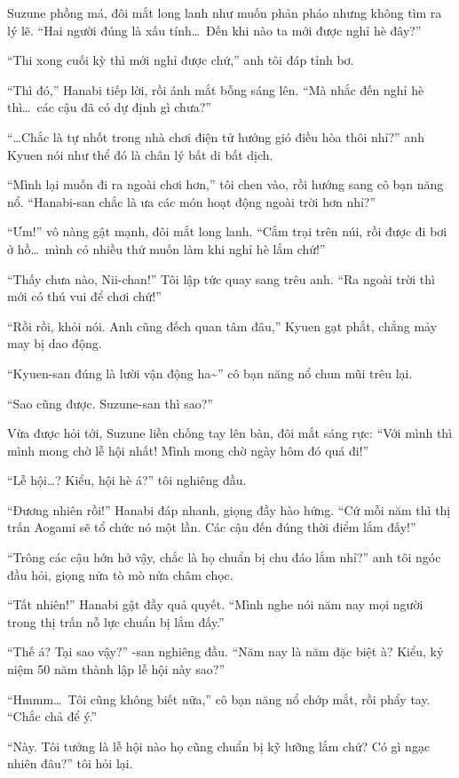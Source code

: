 \documentclass[../main.tex]{subfiles}
\begin{document}
Suzune phồng má, đôi mắt long lanh như muốn phản pháo nhưng không tìm ra lý lẽ. ``Hai người đúng là xấu tính\dots\ Đến khi nào ta mới được nghỉ hè đây?''

``Thi xong cuối kỳ thì mới nghỉ được chứ,'' anh tôi đáp tỉnh bơ.

``Thì đó,'' Hanabi tiếp lời, rồi ánh mắt bỗng sáng lên. ``Mà nhắc đến nghỉ hè thì\dots\ các cậu đã có dự định gì chưa?''

``\dots Chắc là tự nhốt trong nhà chơi điện tử hưởng gió điều hòa thôi nhỉ?'' anh Kyuen nói như thể đó là chân lý bất di bất dịch.

``Mình lại muốn đi ra ngoài chơi hơn,'' tôi chen vào, rồi hướng sang cô bạn năng nổ. ``Hanabi-san chắc là ưa các món hoạt động ngoài trời hơn nhỉ?''

``Ưm!'' vô nàng gật mạnh, đôi mắt long lanh. ``Cắm trại trên núi, rồi được đi bơi ở hồ\dots\ mình có nhiều thứ muốn làm khi nghỉ hè lắm chứ!''

``Thấy chưa nào, Nii-chan!'' Tôi lập tức quay sang trêu anh. ``Ra ngoài trời thì mới có thú vui để chơi chứ!''

``Rồi rồi, khỏi nói. Anh cũng đếch quan tâm đâu,'' Kyuen gạt phắt, chẳng mảy may bị dao động.

``Kyuen-san đúng là lười vận động ha\~{}'' cô bạn năng nổ chun mũi trêu lại.

``Sao cũng được. Suzune-san thì sao?''

Vừa được hỏi tới, Suzune liền chống tay lên bàn, đôi mắt sáng rực: ``Với mình thì mình mong chờ lễ hội nhất! Mình mong chờ ngày hôm đó quá đi!''

``Lễ hội\dots? Kiểu, hội hè á?'' tôi nghiêng đầu.

``Đương nhiên rồi!'' Hanabi đáp nhanh, giọng đầy hào hứng. ``Cứ mỗi năm thì thị trấn Aogami sẽ tổ chức nó một lần. Các cậu đến đúng thời điểm lắm đấy!''

``Trông các cậu hớn hở vậy, chắc là họ chuẩn bị chu đáo lắm nhỉ?'' anh tôi ngóc đầu hỏi, giọng nửa tò mò nửa châm chọc.

``Tất nhiên!'' Hanabi gật đầy quả quyết. ``Mình nghe nói năm nay mọi người trong thị trấn nỗ lực chuẩn bị lắm đấy.''

``Thế á? Tại sao vậy?'' -san nghiêng đầu. ``Năm nay là năm đặc biệt à? Kiểu, kỷ niệm 50 năm thành lập lễ hội này sao?''

``Hmmm\dots\ Tôi cũng không biết nữa,'' cô bạn năng nổ chớp mắt, rồi phẩy tay. ``Chắc chả để ý.''

``Này. Tôi tưởng là lễ hội nào họ cũng chuẩn bị kỹ lưỡng lắm chứ? Có gì ngạc nhiên đâu?'' tôi hỏi lại.
\end{document}
